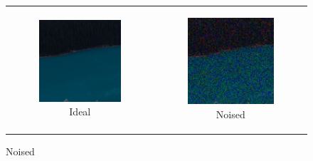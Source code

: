\begin{figure}
  \centering
  \begin{tabular}{cc}
    \begin{subfigure}{0.3\textwidth}
      \includegraphics[width=\linewidth]{inc/research/simple/original.png}
      \caption{Ideal}
    \end{subfigure} &
    \begin{subfigure}{0.3\textwidth}
      \includegraphics[width=\linewidth]{inc/research/simple/noised.png}
      \caption{Noised}
    \end{subfigure} \\
    

\end{tabular}
\end{figure}
